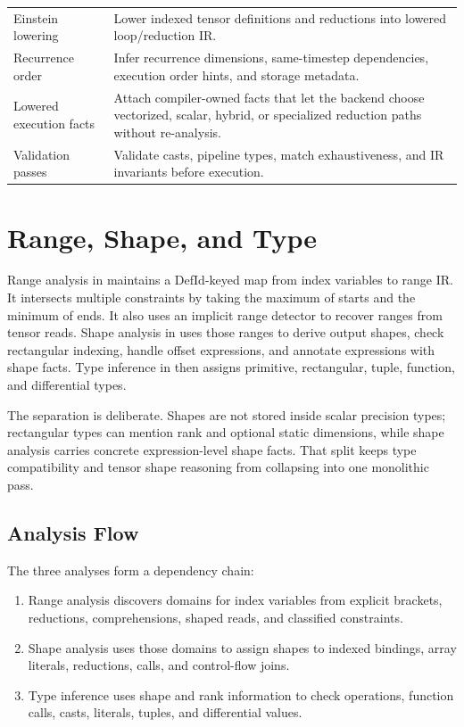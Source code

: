 \begin{table}[p]
\begin{tabular}{@{}L{0.32\textwidth}L{0.56\textwidth}@{}}
Einstein lowering & Lower indexed tensor definitions and reductions into lowered loop/reduction IR. \\
Recurrence order & Infer recurrence dimensions, same-timestep dependencies, execution order hints, and storage metadata. \\
Lowered execution facts & Attach compiler-owned facts that let the backend choose vectorized, scalar, hybrid, or specialized reduction paths without re-analysis. \\
Validation passes & Validate casts, pipeline types, match exhaustiveness, and IR invariants before execution. \\
\bottomrule
\end{tabular}
\end{table}

\section{Range, Shape, and Type}

Range analysis in  maintains a
DefId-keyed map from index variables to range IR. It intersects multiple
constraints by taking the maximum of starts and the minimum of ends. It also
uses an implicit range detector to recover ranges from tensor reads. Shape
analysis in  uses those ranges to
derive output shapes, check rectangular indexing, handle offset expressions, and
annotate expressions with shape facts. Type inference in
 then assigns primitive,
rectangular, tuple, function, and differential types.

The separation is deliberate. Shapes are not stored inside scalar precision
types; rectangular types can mention rank and optional static dimensions, while
shape analysis carries concrete expression-level shape facts. That split keeps
type compatibility and tensor shape reasoning from collapsing into one
monolithic pass.

\subsection{Analysis Flow}

The three analyses form a dependency chain:

\begin{enumerate}
\item Range analysis discovers domains for index variables from explicit
brackets, reductions, comprehensions, shaped reads, and classified constraints.
\item Shape analysis uses those domains to assign shapes to indexed bindings,
array literals, reductions, calls, and control-flow joins.
\item Type inference uses shape and rank information to check operations,
function calls, casts, literals, tuples, and differential values.
\end{enumerate}

